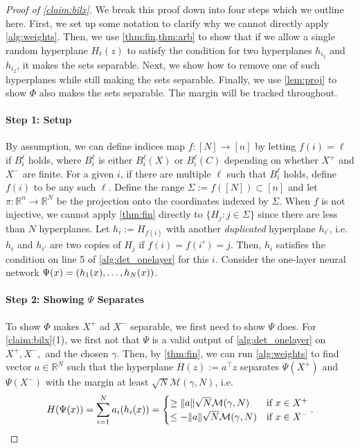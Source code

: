 \documentclass[aoap]{imsart}
\numberwithin{equation}{section}
\theoremstyle{definition}
\theoremstyle{remark}
\newcommand{\R}{\mathbb{R}} %
\numberwithin{equation}{section}
\newcommand{\0}{\mathbf{0}}
\newcommand{\1}{\mathbf{1}}
\let \Re \relax
\DeclareMathOperator{\Re}{ReLU}
\numberwithin{equation}{section}
\begin{document}
\begin{proof}[Proof of \cref{claim:bilx}]
We break this proof down into four steps which we outline here. First, we set up some notation to clarify why we cannot directly apply \cref{alg:weights}. Then, we use \cref{thm:fin,thm:arb} to show that if we allow a single random hyperplane $H_\ell(z)$ to satisfy the condition for two hyperplanes $h_{i_1}$ and $h_{i_2}$, it makes the sets separable. Next, we show how to remove one of such hyperplanes while still making the sets separable. Finally, we use \cref{lem:proj} to show $\Phi$ also makes the sets separable. The margin will be tracked throughout.

\paragraph{Step 1: Setup}
By assumption, we can define indices map $f:[N]\to [n]$ by letting $f(i)=\ell$ if $B_i^\ell$ holds, where $B_i^\ell$ is either $B_i^\ell (X)$ or $B_i^\ell (C)$ depending on whether $X^+$ and $X^-$ are finite. For a given $i$, if there are multiple $\ell$ such that $B_i^\ell$ holds, define $f(i)$ to be any such $\ell$. Define the range $\Sigma :=f([N])\subset [n]$ and let $\pi:\R^n\to\R^N$ be the projection onto the coordinates indexed by $\Sigma$. When $f$ is not injective, we cannot apply \cref{thm:fin} directly to $\lbrace H_j:j\in\Sigma\rbrace$ since there are less than $N$ hyperplanes.  Let $h_i:=H_{f(i)}$ with another  \emph{duplicated} hyperplane $h_{i'}$, i.e. $h_i$ and $h_{i'}$ are two copies of $H_j$ if $f(i)=f(i')=j$. Then, $h_i$ satisfies the condition on line 5 of \cref{alg:det_onelayer} for this $i$. Consider the one-layer neural network $\Psi(x)=\Re(h_1(x), \dots, h_N(x))$.

\paragraph{Step 2: Showing $\Psi$ Separates}
To show $\Phi$ makes $X^+$ ad $X^-$ separable, we first need to show $\Psi$ does. For \cref{claim:bilx}(1), we first not that $\Psi$ is a valid output of \cref{alg:det_onelayer} on $X^+, X^-,$ and the chosen $\gamma$. Then, by \cref{thm:fin}, we can run \cref{alg:weights} to find vector $a\in \R^N$ such that the hyperplane $H(z):=a^{\intercal}z$ separates $\Psi(X^+)$ and $\Psi(X^-)$ with the margin at least $\sqrt{N}\mathcal{M}(\gamma, N)$, i.e.
\begin{equation}\label{eq:Hhxi}
H(\Psi(x))=\sum_{i=1}^N a_i \Re(h_i(x)) =\begin{cases} \geq \Vert a\Vert \sqrt{N}\mathcal{M}(\gamma, N) &\textup{if }x\in X^+ \\ \leq - \Vert a\Vert\sqrt{N} \mathcal{M}(\gamma, N) &\textup{if }x\in X^-
\end{cases}.
\end{equation}


\end{proof}
\end{document}
